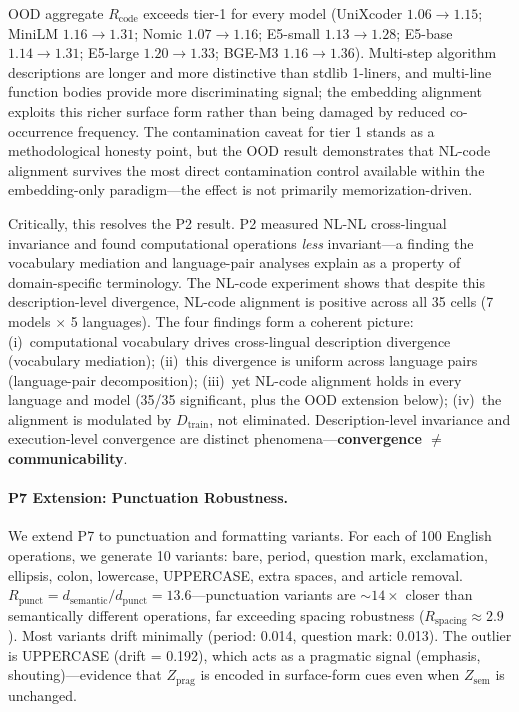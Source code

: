 \documentclass[11pt]{article}
\theoremstyle{definition}
\newcommand{\Zsem}{Z_{\text{sem}}}
\newcommand{\Zprag}{Z_{\text{prag}}}
\newcommand{\Dtrain}{D_{\text{train}}}
\begin{document}
OOD aggregate $R_{\text{code}}$ exceeds tier-1 for every model (UniXcoder $1.06 \to 1.15$; MiniLM $1.16 \to 1.31$; Nomic $1.07 \to 1.16$; E5-small $1.13 \to 1.28$; E5-base $1.14 \to 1.31$; E5-large $1.20 \to 1.33$; BGE-M3 $1.16 \to 1.36$). Multi-step algorithm descriptions are longer and more distinctive than stdlib 1-liners, and multi-line function bodies provide more discriminating signal; the embedding alignment exploits this richer surface form rather than being damaged by reduced co-occurrence frequency. The contamination caveat for tier 1 stands as a methodological honesty point, but the OOD result demonstrates that NL-code alignment survives the most direct contamination control available within the embedding-only paradigm---the effect is not primarily memorization-driven.

Critically, this resolves the P2 result. P2 measured NL-NL cross-lingual invariance and found computational operations \emph{less} invariant---a finding the vocabulary mediation and language-pair analyses explain as a property of domain-specific terminology. The NL-code experiment shows that despite this description-level divergence, NL-code alignment is positive across all 35 cells (7 models $\times$ 5 languages). The four findings form a coherent picture: (i)~computational vocabulary drives cross-lingual description divergence (vocabulary mediation); (ii)~this divergence is uniform across language pairs (language-pair decomposition); (iii)~yet NL-code alignment holds in every language and model (35/35 significant, plus the OOD extension below); (iv)~the alignment is modulated by $\Dtrain$, not eliminated. Description-level invariance and execution-level convergence are distinct phenomena---\textbf{convergence $\neq$ communicability}.

\paragraph{P7 Extension: Punctuation Robustness.}
We extend P7 to punctuation and formatting variants. For each of 100 English operations, we generate 10 variants: bare, period, question mark, exclamation, ellipsis, colon, lowercase, UPPERCASE, extra spaces, and article removal. $R_{\text{punct}} = d_{\text{semantic}} / d_{\text{punct}} = 13.6$---punctuation variants are ${\sim}14\times$ closer than semantically different operations, far exceeding spacing robustness ($R_{\text{spacing}} \approx 2.9$). Most variants drift minimally (period: 0.014, question mark: 0.013). The outlier is UPPERCASE (drift = 0.192), which acts as a pragmatic signal (emphasis, shouting)---evidence that $\Zprag$ is encoded in surface-form cues even when $\Zsem$ is unchanged.
\end{document}
